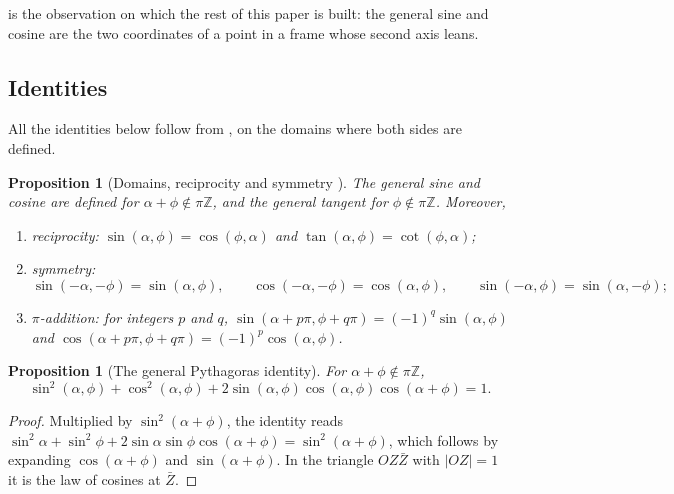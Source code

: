 \documentclass[11pt,a4paper]{amsart}
\theoremstyle{plain}
\newtheorem{proposition}[theorem]{Proposition}
\theoremstyle{definition}
\theoremstyle{remark}
\newcommand{\seg}[1]{\lvert #1\rvert}            %
\newcommand{\Zb}{\bar{Z}}                        %
\begin{document}
 is the observation on which the rest of this paper is built: the general sine and cosine are the two coordinates of a point in a frame whose second axis leans.

\subsection{Identities}\label{subsec:gs-identities}

All the identities below follow from , on the domains where both sides are defined.

\begin{proposition}[Domains, reciprocity and symmetry {\citep[Propositions~4.1, 4.3, 4.9 and~4.10]{Derraz2026GSP}}]\label{prop:gs-basic}
The general sine and cosine are defined for $\alpha + \phi \notin \pi\mathbb{Z}$, and the general tangent for $\phi \notin \pi\mathbb{Z}$. Moreover,
\begin{enumerate}
  \item \emph{reciprocity:} $\sin(\alpha, \phi) = \cos(\phi, \alpha)$ and $\tan(\alpha, \phi) = \cot(\phi, \alpha)$;
  \item \emph{symmetry:}
  \[
  \sin(-\alpha, -\phi) = \sin(\alpha, \phi) , \qquad \cos(-\alpha, -\phi) = \cos(\alpha, \phi) , \qquad \sin(-\alpha, \phi) = \sin(\alpha, -\phi) ;
  \]
  \item \emph{$\pi$-addition:} for integers $p$ and $q$, $\sin(\alpha + p\pi, \phi + q\pi) = (-1)^q\sin(\alpha, \phi)$ and $\cos(\alpha + p\pi, \phi + q\pi) = (-1)^p\cos(\alpha, \phi)$.
\end{enumerate}
\end{proposition}

\begin{proposition}[The general Pythagoras identity]\label{prop:gs-pythagoras}
For $\alpha + \phi \notin \pi\mathbb{Z}$,
\[
\sin^2(\alpha, \phi) + \cos^2(\alpha, \phi) + 2\sin(\alpha, \phi)\cos(\alpha, \phi)\cos(\alpha + \phi) = 1 .
\]
\end{proposition}

\begin{proof}
Multiplied by $\sin^2(\alpha + \phi)$, the identity reads $\sin^2\alpha + \sin^2\phi + 2\sin\alpha\sin\phi\cos(\alpha + \phi) = \sin^2(\alpha + \phi)$, which follows by expanding $\cos(\alpha + \phi)$ and $\sin(\alpha + \phi)$. In the triangle $OZ\Zb$ with $\seg{OZ} = 1$ it is the law of cosines at $\Zb$.
\end{proof}
\end{document}
